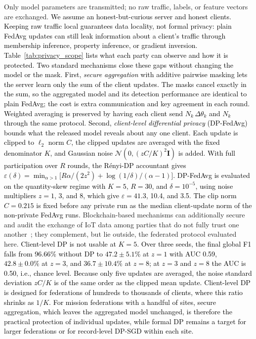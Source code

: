 \documentclass[conference]{IEEEtran}
\begin{document}
Only model parameters are transmitted; no raw traffic, labels,
or feature vectors are exchanged. \textcolor{black}{We assume
an honest-but-curious server and honest clients. Keeping raw traffic
local guarantees data locality, not formal privacy: plain FedAvg
updates can still leak information about a client's traffic through
membership inference, property inference, or gradient inversion.
Table~\ref{tab:privacy_scope} lists what each party can observe and
how it is protected. Two standard mechanisms close these gaps without
changing the model or the mask. First, \textit{secure aggregation}
with additive pairwise masking lets the server learn only the sum of
the client updates. The masks cancel exactly in the sum, so the
aggregated model and its detection performance are identical to plain
FedAvg; the cost is extra communication and key agreement in each
round. Weighted averaging is preserved by having each client send
$N_k\,\Delta\theta_k$ and $N_k$ through the same protocol. Second,
\textit{client-level differential privacy} (DP-FedAvg) bounds what
the released model reveals about any one client. Each update is
clipped to $\ell_2$ norm $C$, the clipped updates are averaged with
the fixed denominator $K$, and Gaussian noise
$\mathcal{N}(0,(zC/K)^2\mathbf{I})$ is added. With full participation
over $R$ rounds, the R\'enyi-DP accountant gives
$\varepsilon(\delta)=\min_{\alpha>1}\bigl[R\alpha/(2z^2)+
\log(1/\delta)/(\alpha-1)\bigr]$. DP-FedAvg is evaluated on the
quantity-skew regime with $K=5$, $R=30$, and $\delta=10^{-5}$, using
noise multipliers $z=1$, 3, and 8, which give $\varepsilon=41.3$,
10.4, and 3.5. The clip norm $C=0.215$ is fixed before any private
run as the median client-update norm of the non-private FedAvg runs.}
Blockchain-based mechanisms can additionally secure and audit the
exchange of IoT data among parties that do not fully trust one
another~\cite{amadi2026symmetric}; they complement, but lie outside,
the federated protocol evaluated here.
\textcolor{black}{Client-level DP is not usable at $K=5$. Over
three seeds, the final global F1 falls from 96.66\% without DP to
$47.2\pm5.1\%$ at $z=1$ with AUC 0.59, $42.8\pm0.0\%$ at $z=3$, and
$36.7\pm10.4\%$ at $z=8$; at $z=3$ and $z=8$ the AUC is 0.50, i.e.,
chance level. Because only five updates are averaged, the noise
standard deviation $zC/K$ is of the same order as the clipped mean
update. Client-level DP is designed for federations of hundreds to
thousands of clients, where this ratio shrinks as $1/K$. For mission
federations with a handful of sites, secure aggregation, which leaves
the aggregated model unchanged, is therefore the practical protection
of individual updates, while formal DP remains a target for larger
federations or for record-level DP-SGD within each site.}
\end{document}
